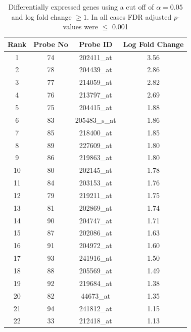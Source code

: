 \documentclass[a4paper, 12pt]{report}
\begin{document}
\begin{table}[H]
\begin{centering}
\begin{tabular}{cccc}
  \hline
Rank & Probe No & Probe ID & Log Fold Change \\ 
  \hline
1 &  74 & 202411\_at & 3.56 \\ 
  2 &  78 & 204439\_at & 2.86 \\ 
  3 &  77 & 214059\_at & 2.82 \\ 
  4 &  76 & 213797\_at & 2.69 \\ 
  5 &  75 & 204415\_at & 1.88 \\ 
  6 &  83 & 205483\_s\_at & 1.86 \\ 
  7 &  85 & 218400\_at & 1.85 \\ 
  8 &  89 & 227609\_at & 1.80 \\ 
  9 &  86 & 219863\_at & 1.80 \\ 
  10 &  80 & 202145\_at & 1.78 \\ 
  11 &  84 & 203153\_at & 1.76 \\ 
  12 &  79 & 219211\_at & 1.75 \\ 
  13 &  81 & 202869\_at & 1.74 \\ 
  14 &  90 & 204747\_at & 1.71 \\ 
  15 &  87 & 202086\_at & 1.63 \\ 
  16 &  91 & 204972\_at & 1.60 \\ 
  17 &  93 & 241916\_at & 1.50 \\ 
  18 &  88 & 205569\_at & 1.49 \\ 
  19 &  92 & 219684\_at & 1.38 \\ 
  20 &  82 & 44673\_at & 1.35 \\ 
  21 &  94 & 241812\_at & 1.15 \\ 
  22 &  33 & 212418\_at & 1.13 \\ 
   \hline
\end{tabular}
\caption{Differentially expressed genes using a cut off of $\alpha=0.05$ and log fold change $\ge 1$. In all cases FDR adjusted $p$-values were $\le$ 0.001} 
\label{T:GEGD}
\end{centering}
\end{table}
\end{document}

